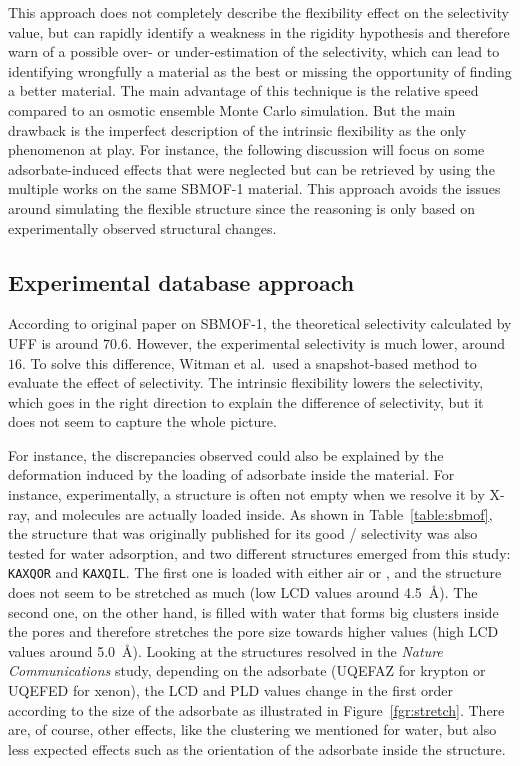 \documentclass[main]{subfiles}
\begin{document}
This approach does not completely describe the flexibility effect on the selectivity value, but can rapidly identify a weakness in the rigidity hypothesis and therefore warn of a possible over- or under-estimation of the selectivity, which can lead to identifying wrongfully a material as the best or missing the opportunity of finding a better material. The main advantage of this technique is the relative speed compared to an osmotic ensemble Monte Carlo simulation.\autocite{Bousquet2012} But the main drawback is the imperfect description of the intrinsic flexibility as the only phenomenon at play. For instance, the following discussion will focus on some adsorbate-induced effects that were neglected but can be retrieved by using the multiple works on the same SBMOF-1 material. This approach avoids the issues around simulating the flexible structure since the reasoning is only based on experimentally observed structural changes. 


\subsection{Experimental database approach}

According to original paper on SBMOF-1,\autocite{Banerjee_2016} the theoretical selectivity calculated by UFF is around $70.6$. However, the experimental selectivity is much lower, around $16$. To solve this difference, Witman et al.\ used a snapshot-based method to evaluate the effect of selectivity. The intrinsic flexibility lowers the selectivity, which goes in the right direction to explain the difference of selectivity, but it does not seem to capture the whole picture. 

For instance, the discrepancies observed could also be explained by the deformation induced by the loading of adsorbate inside the material. For instance, experimentally, a structure is often not empty when we resolve it by X-ray, and molecules are actually loaded inside. As shown in Table~\ref{table:sbmof}, the structure that was originally published for its good / selectivity\autocite{Yeh2012,Banerjee2012} was also tested for water adsorption, and two different structures emerged from this study: \texttt{KAXQOR} and \texttt{KAXQIL}. The first one is loaded with either air or , and the structure does not seem to be stretched as much (low LCD values around \SI{4.5}{\angstrom}). The second one, on the other hand, is filled with water that forms big clusters inside the pores and therefore stretches the pore size towards higher values (high LCD values around \SI{5.0}{\angstrom}). Looking at the structures resolved in the \emph{Nature Communications} study\autocite{Banerjee_2016}, depending on the adsorbate (UQEFAZ for krypton or UQEFED for xenon), the LCD and PLD values change in the first order according to the size of the adsorbate as illustrated in Figure~\ref{fgr:stretch}. There are, of course, other effects, like the clustering we mentioned for water, but also less expected effects such as the orientation of the adsorbate inside the structure. 
\end{document}
